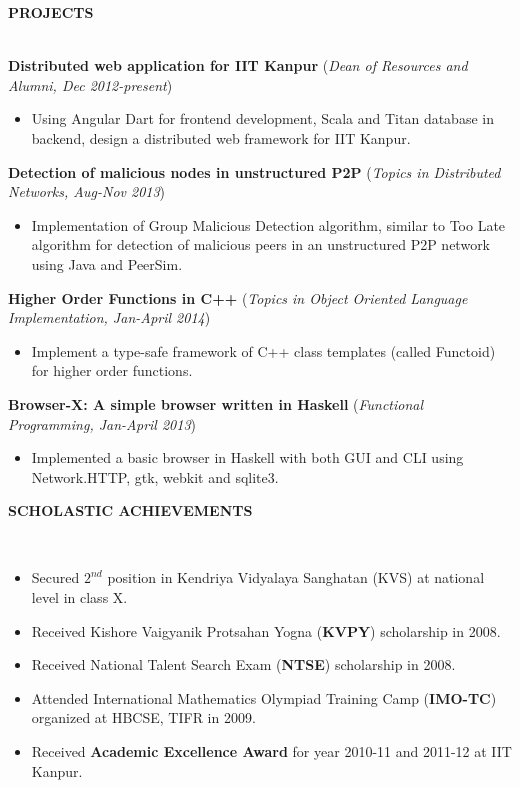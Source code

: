 \documentclass[10pt]{article}
\newcommand{\cvsectiontitle}[1]{
    		\colorbox{gray!40}{%
        \begin{minipage}{0.989\linewidth}%
            \vspace*{1pt}%
            \large\indent\textbf{#1}
            \vspace*{1pt}%
        \end{minipage}%
   		}\\[1mm]
		}
\begin{document}
\cvsectiontitle{PROJECTS}
\textbf{Distributed web application for IIT Kanpur}
(\textit{Dean of Resources and Alumni, Dec 2012-present})
\vspace{-0.2cm}
\begin{itemize}
	\item Using Angular Dart for frontend development, Scala and Titan database in backend, design a distributed web framework for IIT Kanpur.
\end{itemize}
\textbf{Detection of malicious nodes in unstructured P2P} (\textit{Topics in Distributed Networks, Aug-Nov 2013})
\vspace{-0.2cm}
\begin{itemize}
	\item Implementation of Group Malicious Detection algorithm, similar to Too Late algorithm for detection of malicious peers in an unstructured P2P network using Java and PeerSim.
\end{itemize}
\textbf{Higher Order Functions in C++} (\textit{Topics in Object Oriented Language Implementation, Jan-April 2014})
\vspace{-0.2cm}
\begin{itemize}
	\item Implement a type-safe framework of C++ class templates (called Functoid) for higher order functions.
\end{itemize}
\textbf{Browser-X: A simple browser written in Haskell} (\textit{Functional Programming, Jan-April 2013})
\vspace{-0.2cm}
\begin{itemize}
	\item Implemented a basic browser in Haskell with both GUI and CLI using Network.HTTP, gtk, webkit and sqlite3.
\end{itemize}

\cvsectiontitle{SCHOLASTIC ACHIEVEMENTS}
\vspace{-0.6cm}
\begin{itemize}[leftmargin=0.5cm]
\item Secured $2^{nd}$ position in Kendriya Vidyalaya Sanghatan (KVS) at national level in class X.
\item Received Kishore Vaigyanik Protsahan Yogna (\textbf{KVPY}) scholarship in 2008.
\item Received National Talent Search Exam (\textbf{NTSE}) scholarship in 2008.
\item Attended International Mathematics Olympiad Training Camp (\textbf{IMO-TC}) organized at HBCSE, TIFR in 2009.
\item Received \textbf{Academic Excellence Award} for year 2010-11 and 2011-12 at IIT Kanpur.
\end{itemize}
\end{document}

